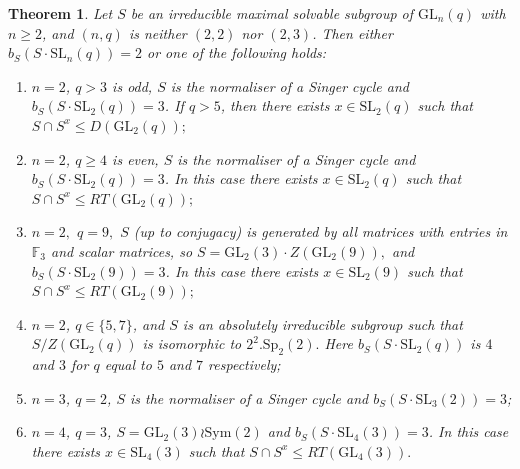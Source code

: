 \documentclass[a4paper,reqno,11pt]{amsart}
\newtheorem{Th}{Theorem}[section]
\theoremstyle{definition}
\theoremstyle{remark}
\numberwithin{equation}{section}
\newcommand{\Sym}{\mathrm{Sym}}
\newcommand{\SL}{{\mathrm{SL}}}
\newcommand{\GL}{{\mathrm{GL}}}
\newcommand{\Sp}{{\mathrm{Sp}}}
\begin{document}
\begin{Th}\label{irred}
Let $S$ be an irreducible maximal solvable  subgroup of $\GL_n(q)$ with $n \ge 2$, and $(n,q)$ is neither  $(2,2)$ nor $(2,3)$. Then either $b_S(S \cdot \SL_n(q))=2$ or one of the following holds: 
\begin{enumerate}[font=\normalfont]
\item $n =2$,  $q>3$ is odd, $S$ is the normaliser of a Singer cycle and $b_S(S \cdot \SL_2(q))=3$. If $q>5$, then there exists $x\in \SL_2(q)$ such that  $S \cap S^x \le D(\GL_2(q));$ \label{irred11}
\item $n =2$,  $q\ge 4$ is even,  $S$ is the normaliser of a Singer cycle and $b_S(S \cdot \SL_2(q))=3$. In this case there exists $x\in \SL_2(q)$ such that  $S \cap S^x \le RT(\GL_2(q));$ \label{irred12}
\item $n=2,$ $q=9,$ $S$ (up to conjugacy) is generated by all matrices with entries in $\mathbb{F}_3$ and scalar matrices, so $S=\GL_2(3) \cdot Z(\GL_2(9)),$ and $b_S(S \cdot \SL_2(9))=3$. In this case there exists $x \in \SL_2(9)$ such that $S \cap S^x \le RT(\GL_2(9));$ \label{irred135}
\item $n=2$, $q \in \{5,7\}$, and $S$  is an absolutely irreducible subgroup such that $S/Z(\GL_2(q))$ is isomorphic to $2^2.\Sp_2(2).$  Here  $b_S(S \cdot \SL_2(q))$ is $4$ and $3$ for $q$ equal to $5$ and $7$ respectively;\label{irred13}
\item $n=3$, $q=2$,  $S$ is the normaliser of a Singer cycle and $b_S(S \cdot \SL_3(2))=3$; \label{irred14} 
\item $n=4$, $q=3$, $S=\GL_2(3) \wr \Sym(2)$ and $b_S(S \cdot \SL_4(3))=3$. In this case there exists $x \in \SL_4(3)$ such that $S \cap S^x \le RT(\GL_4(3)).$ \label{irred15} %
\end{enumerate} 
\end{Th}
\end{document}

